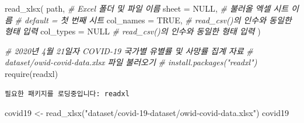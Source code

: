 \documentclass[
  11pt,
]{krantz}
\newenvironment{Shaded}{\begin{snugshade}}{\end{snugshade}}
\newcommand{\AttributeTok}[1]{\textcolor[rgb]{0.61,0.61,0.61}{#1}}
\newcommand{\CommentTok}[1]{\textcolor[rgb]{0.37,0.37,0.37}{\textit{#1}}}
\newcommand{\ConstantTok}[1]{\textcolor[rgb]{0,0,0}{#1}}
\newcommand{\FunctionTok}[1]{\textcolor[rgb]{0,0,0}{#1}}
\newcommand{\NormalTok}[1]{#1}
\newcommand{\OtherTok}[1]{\textcolor[rgb]{0.37,0.37,0.37}{#1}}
\newcommand{\StringTok}[1]{\textcolor[rgb]{0.5,0.5,0.5}{#1}}
\begin{document}
\footnotesize

\begin{Shaded}
\begin{Highlighting}[]
\FunctionTok{read\_xlsx}\NormalTok{(}
\NormalTok{  path, }\CommentTok{\# Excel 폴더 및 파일 이름}
  \AttributeTok{sheet =} \ConstantTok{NULL}\NormalTok{, }\CommentTok{\# 불러올 엑셀 시트 이름}
                \CommentTok{\# default = 첫 번째 시트}
  \AttributeTok{col\_names =} \ConstantTok{TRUE}\NormalTok{, }\CommentTok{\# read\_csv()의 인수와 동일한 형태 입력}
  \AttributeTok{col\_types =} \ConstantTok{NULL}  \CommentTok{\# read\_csv()의 인수와 동일한 형태 입력}
\NormalTok{)}
\end{Highlighting}
\end{Shaded}

\normalsize

\footnotesize

\begin{Shaded}
\begin{Highlighting}[]
\CommentTok{\# 2020년 4월 21일자 COVID{-}19 국가별 유별률 및 사망률 집계 자료}
\CommentTok{\# dataset/owid{-}covid{-}data.xlsx 파일 불러오기 }
\CommentTok{\# install.packages("readxl")}
\FunctionTok{require}\NormalTok{(readxl)}
\end{Highlighting}
\end{Shaded}

\begin{verbatim}
필요한 패키지를 로딩중입니다: readxl
\end{verbatim}

\begin{Shaded}
\begin{Highlighting}[]
\NormalTok{covid19 }\OtherTok{\textless{}{-}} \FunctionTok{read\_xlsx}\NormalTok{(}\StringTok{"dataset/covid{-}19{-}dataset/owid{-}covid{-}data.xlsx"}\NormalTok{)}
\NormalTok{covid19}
\end{Highlighting}
\end{Shaded}
\end{document}
